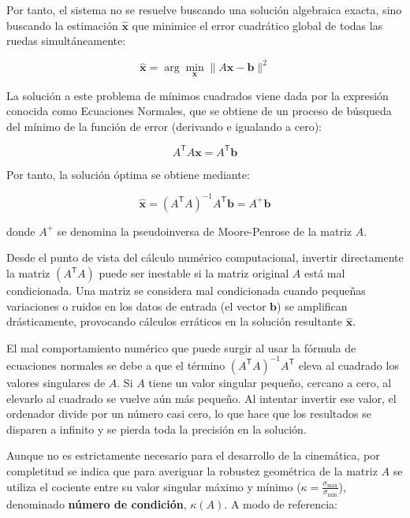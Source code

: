 \documentclass[11pt,a4paper]{article}
\newcommand{\trans}{\mathsf{T}}      %
\begin{document}
Por tanto, el sistema no se resuelve buscando una solución algebraica exacta, sino buscando la estimación \(\hat{\mathbf{x}}\) que minimice el error cuadrático global de todas las ruedas simultáneamente:

\begin{equation}
    \hat{\mathbf{x}} = \arg\min_{\mathbf{x}} \|A\mathbf{x} - \mathbf{b}\|^2
\end{equation}

La solución a este problema de mínimos cuadrados viene dada por la expresión conocida como Ecuaciones Normales, que se obtiene de un proceso de búsqueda del mínimo de la función de error (derivando e igualando a cero):

\begin{equation}
    A^{\trans} A \mathbf{x} = A^{\trans} \mathbf{b}
\end{equation}

Por tanto, la solución óptima se obtiene mediante:

\begin{equation}
    \hat{\mathbf{x}} = (A^{\trans}A)^{-1}A^{\trans}\mathbf{b} = A^+\mathbf{b}
\end{equation}

donde \(A^+\) se denomina la pseudoinversa de Moore-Penrose de la matriz \(A\).

Desde el punto de vista del cálculo numérico computacional, invertir directamente la matriz \((A^{\trans}A)\) puede ser inestable si la matriz original \(A\) está mal condicionada. Una matriz se considera mal condicionada cuando pequeñas variaciones o ruidos en los datos de entrada (el vector \(\mathbf{b}\)) se amplifican drásticamente, provocando cálculos erráticos en la solución resultante \(\hat{\mathbf{x}}\).

El mal comportamiento numérico que puede surgir al usar la fórmula de ecuaciones normales se debe a que el término \((A^{\trans}A)^{-1}\allowbreak A^{\trans}\) eleva al cuadrado los valores singulares de \(A\). Si \(A\) tiene un valor singular pequeño, cercano a cero, al elevarlo al cuadrado se vuelve aún más pequeño. Al intentar invertir ese valor, el ordenador divide por un número casi cero, lo que hace que los resultados se disparen a infinito y se pierda toda la precisión en la solución.

Aunque no es estrictamente necesario para el desarrollo de la cinemática, por completitud se indica que para averiguar la robustez geométrica de la matriz \(A\) se utiliza el cociente entre su valor singular máximo y mínimo (\(\kappa = \frac{\sigma_{\max}}{\sigma_{\min}}\)), denominado \textbf{número de condición}, \(\kappa(A)\). A modo de referencia:
\end{document}
